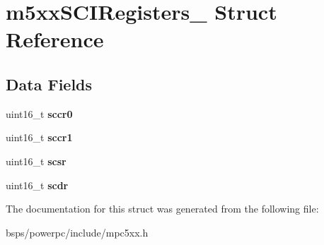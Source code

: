 \hypertarget{structm5xxSCIRegisters__}{}\section{m5xx\+S\+C\+I\+Registers\+\_\+ Struct Reference}
\label{structm5xxSCIRegisters__}
\subsection*{Data Fields}
\begin{DoxyCompactItemize}
\item 
\mbox{\label{structm5xxSCIRegisters___ab4c7c9e839a1ca29200a8e2696bbef63}} 
uint16\+\_\+t {\bfseries sccr0}
\item 
\mbox{\label{structm5xxSCIRegisters___adfa22ccd190317d0a0564f6a5d95352c}} 
uint16\+\_\+t {\bfseries sccr1}
\item 
\mbox{\label{structm5xxSCIRegisters___a5e2b329dfa8f75a8bf0b83be2ca17073}} 
uint16\+\_\+t {\bfseries scsr}
\item 
\mbox{\label{structm5xxSCIRegisters___a7832ecc952e442c737afd09ddeea96f2}} 
uint16\+\_\+t {\bfseries scdr}
\end{DoxyCompactItemize}


The documentation for this struct was generated from the following file\+:\begin{DoxyCompactItemize}
\item 
bsps/powerpc/include/mpc5xx.\+h\end{DoxyCompactItemize}
